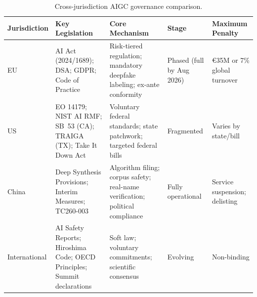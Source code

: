 
\begin{table}[htbp]
\centering
\caption{Cross-jurisdiction AIGC governance comparison.}
\label{tab:governance}
\small
\begin{tabular}{p{1.8cm}p{3.2cm}p{2.8cm}p{2.0cm}p{2.8cm}}
\toprule
\textbf{Jurisdiction} & \textbf{Key Legislation} & \textbf{Core Mechanism} & \textbf{Stage} & \textbf{Maximum Penalty} \\
\midrule
EU &
AI Act (2024/1689); DSA; GDPR; Code of Practice &
Risk-tiered regulation; mandatory deepfake labeling; ex-ante conformity &
Phased (full by Aug 2026) &
\euro35M or 7\% global turnover \\
\addlinespace
US &
EO 14179; NIST AI RMF; SB~53 (CA); TRAIGA (TX); Take It Down Act &
Voluntary federal standards; state patchwork; targeted federal bills &
Fragmented &
Varies by state/bill \\
\addlinespace
China &
Deep Synthesis Provisions; Interim Measures; TC260-003 &
Algorithm filing; corpus safety; real-name verification; political compliance &
Fully operational &
Service suspension; delisting \\
\addlinespace
International &
AI Safety Reports; Hiroshima Code; OECD Principles; Summit declarations &
Soft law; voluntary commitments; scientific consensus &
Evolving &
Non-binding \\
\bottomrule
\end{tabular}
\end{table}
